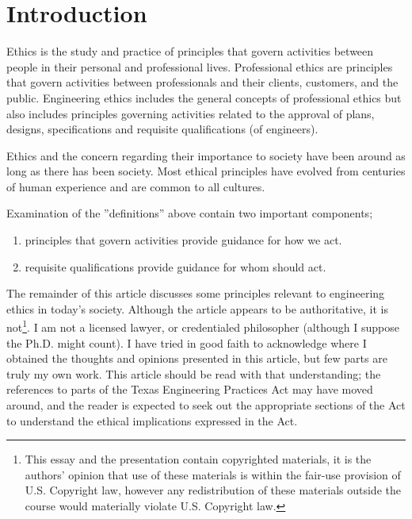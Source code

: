 \section*{Introduction}
Ethics is the study and practice of principles that govern activities between people in their personal and professional lives.  Professional ethics are principles that govern activities between professionals and their clients, customers, and the public.  Engineering ethics includes the general concepts of professional ethics but also includes principles governing activities related to the approval of plans, designs, specifications and requisite qualifications (of engineers).

Ethics and the concern regarding their importance to society have been around as long as there has been society.  Most ethical principles have evolved from centuries of human experience and are common to all cultures.

Examination of the ''definitions'' above contain two important components; 
\begin{enumerate}
\item principles that govern activities provide guidance for how we act.
\item requisite qualifications provide guidance for whom should act.
\end{enumerate}

The remainder of this article discusses some principles relevant to engineering ethics in today's society.  Although the article appears to be authoritative, it is not\footnote{This essay and the presentation contain copyrighted materials, it is the authors' opinion that use of these materials is within the fair-use provision of U.S. Copyright law, however any redistribution of these materials outside the course would materially violate U.S. Copyright law.}.  I am not a licensed lawyer, or credentialed philosopher (although I suppose the Ph.D. might count).  I have tried in good faith to acknowledge where I obtained the thoughts and opinions presented in this article, but few parts are truly my own work.  This article should be read with that understanding; the references to parts of the Texas Engineering Practices Act may have moved around, and the reader is expected to seek out the appropriate sections of the Act to understand the ethical implications expressed in the Act.